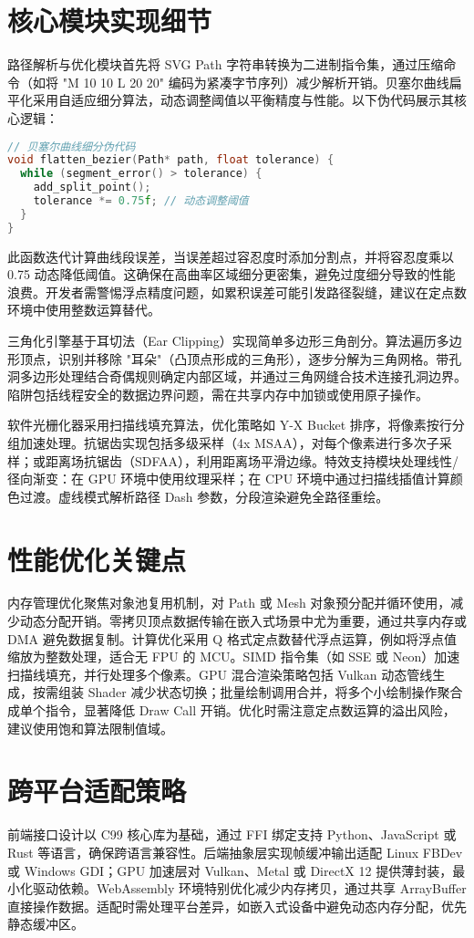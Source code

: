 \chapter{核心模块实现细节}
路径解析与优化模块首先将 SVG Path 字符串转换为二进制指令集，通过压缩命令（如将 "M 10 10 L 20 20" 编码为紧凑字节序列）减少解析开销。贝塞尔曲线扁平化采用自适应细分算法，动态调整阈值以平衡精度与性能。以下伪代码展示其核心逻辑：\par
\begin{lstlisting}[language=c]
// 贝塞尔曲线细分伪代码
void flatten_bezier(Path* path, float tolerance) {
  while (segment_error() > tolerance) {
    add_split_point();
    tolerance *= 0.75f; // 动态调整阈值
  }
}
\end{lstlisting}
此函数迭代计算曲线段误差，当误差超过容忍度时添加分割点，并将容忍度乘以 0.75 动态降低阈值。这确保在高曲率区域细分更密集，避免过度细分导致的性能浪费。开发者需警惕浮点精度问题，如累积误差可能引发路径裂缝，建议在定点数环境中使用整数运算替代。\par
三角化引擎基于耳切法（Ear Clipping）实现简单多边形三角剖分。算法遍历多边形顶点，识别并移除 "耳朵"（凸顶点形成的三角形），逐步分解为三角网格。带孔洞多边形处理结合奇偶规则确定内部区域，并通过三角网缝合技术连接孔洞边界。陷阱包括线程安全的数据边界问题，需在共享内存中加锁或使用原子操作。\par
软件光栅化器采用扫描线填充算法，优化策略如 Y-X Bucket 排序，将像素按行分组加速处理。抗锯齿实现包括多级采样（4x MSAA），对每个像素进行多次子采样；或距离场抗锯齿（SDFAA），利用距离场平滑边缘。特效支持模块处理线性/径向渐变：在 GPU 环境中使用纹理采样；在 CPU 环境中通过扫描线插值计算颜色过渡。虚线模式解析路径 Dash 参数，分段渲染避免全路径重绘。\par
\chapter{性能优化关键点}
内存管理优化聚焦对象池复用机制，对 Path 或 Mesh 对象预分配并循环使用，减少动态分配开销。零拷贝顶点数据传输在嵌入式场景中尤为重要，通过共享内存或 DMA 避免数据复制。计算优化采用 Q 格式定点数替代浮点运算，例如将浮点值缩放为整数处理，适合无 FPU 的 MCU。SIMD 指令集（如 SSE 或 Neon）加速扫描线填充，并行处理多个像素。GPU 混合渲染策略包括 Vulkan 动态管线生成，按需组装 Shader 减少状态切换；批量绘制调用合并，将多个小绘制操作聚合成单个指令，显著降低 Draw Call 开销。优化时需注意定点数运算的溢出风险，建议使用饱和算法限制值域。\par
\chapter{跨平台适配策略}
前端接口设计以 C99 核心库为基础，通过 FFI 绑定支持 Python、JavaScript 或 Rust 等语言，确保跨语言兼容性。后端抽象层实现帧缓冲输出适配 Linux FBDev 或 Windows GDI；GPU 加速层对 Vulkan、Metal 或 DirectX 12 提供薄封装，最小化驱动依赖。WebAssembly 环境特别优化减少内存拷贝，通过共享 ArrayBuffer 直接操作数据。适配时需处理平台差异，如嵌入式设备中避免动态内存分配，优先静态缓冲区。\par
